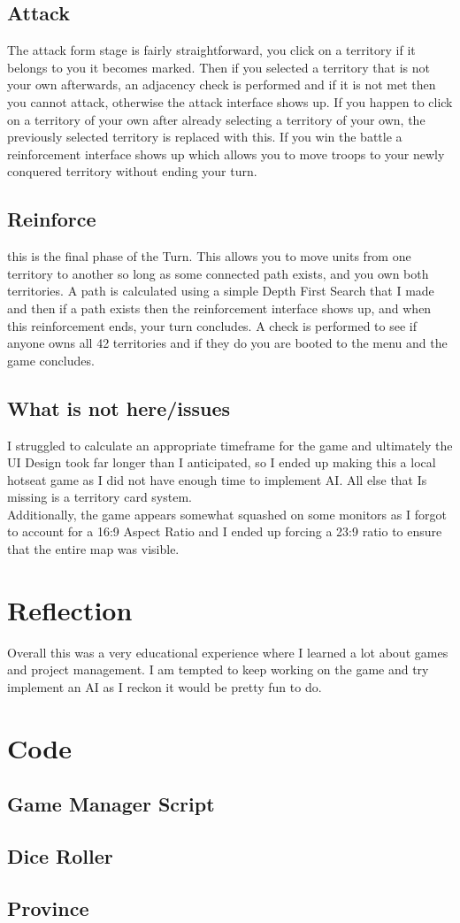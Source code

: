 \documentclass{article}
\begin{document}
		\subsection{Attack}
			The attack form stage is fairly straightforward, you click on a territory if it belongs to you it becomes marked. Then if you selected a territory that is not your own afterwards, an adjacency check is performed and if it is not met then you cannot attack, otherwise the attack interface shows up. If you happen to click on a territory of your own after already selecting a territory of your own, the previously selected territory is replaced with this. If you win the battle a reinforcement interface shows up which allows you to move troops to your newly conquered territory without ending your turn.
		\subsection{Reinforce}
			this is the final phase of the Turn. This allows you to move units from one territory to another so long as some connected path exists, and you own both territories. A path is calculated using a simple Depth First Search that I made and then if a path exists then the reinforcement interface shows up, and when this reinforcement ends, your turn concludes. A check is performed to see if anyone owns all 42 territories and if they do you are booted to the menu and the game concludes.
			
	\subsection{What is not here/issues}
		I struggled to calculate an appropriate timeframe for the game and ultimately the UI Design took far longer than I anticipated, so I ended up making this a local hotseat game as I did not have enough time to implement AI. All else that Is missing is a territory card system.\\
		Additionally, the game appears somewhat squashed on some monitors as I forgot to account for a 16:9 Aspect Ratio and I ended up forcing a 23:9 ratio to ensure that the entire map was visible.
		
	\section{Reflection}
		Overall this was a very educational experience where I learned a lot about games and project management. I am tempted to keep working on the game and try implement an AI as I reckon it would be pretty fun to do.
		
	\section{Code}
	\subsection{Game Manager Script}
	\subsection{Dice Roller}
	\subsection{Province}
			
	
	
\end{document}
